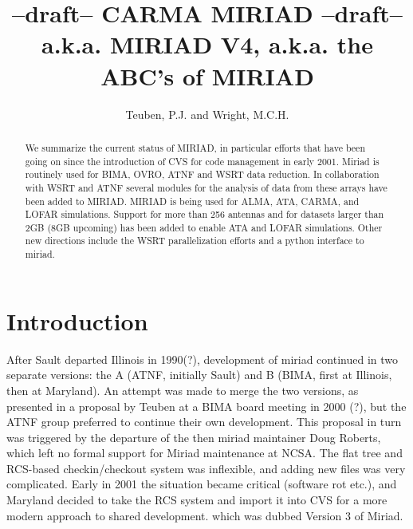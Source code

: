 


\title{
--draft-- {\Large  {\bf CARMA MIRIAD} } --draft--\\
{\footnotesize a.k.a. MIRIAD V4, a.k.a. the ABC's of MIRIAD}}
\medskip

\author{ Teuben, P.J. and Wright, M.C.H.}


\begin{abstract}
 
We summarize the current status of MIRIAD, in particular efforts that
have been going on since the introduction of CVS for code
management in early 2001.  Miriad
is routinely used for BIMA, OVRO, ATNF and WSRT data reduction.  In
collaboration with WSRT and ATNF several modules for the analysis of
data from these arrays have been added to MIRIAD.  MIRIAD is being used
for ALMA, ATA, CARMA, and LOFAR simulations.  Support for more than 256
antennas and for datasets larger than 2GB (8GB upcoming) has been added
to enable ATA and LOFAR simulations. Other new directions include
the WSRT parallelization efforts and a python interface to miriad.


\end{abstract}

\section{Introduction}

After Sault departed Illinois in 1990(?), development of 
miriad continued in two separate versions: the A (ATNF, initially
Sault) and B (BIMA,  first at Illinois, then at Maryland). An attempt was made
to merge the two versions,
as presented in a proposal by Teuben at a BIMA board meeting in 2000 (?), but
the ATNF group preferred to continue their own development. This proposal
in turn was triggered by the departure of the then miriad maintainer
Doug Roberts, which left no formal support for Miriad maintenance at NCSA. 
The flat tree and RCS-based checkin/checkout system was 
inflexible, and adding new files was very complicated.
Early in 2001 the situation became critical (software rot etc.), and 
Maryland decided to take the RCS
system and import it into CVS for a more modern approach to shared
development. which was dubbed Version 3 of Miriad.

